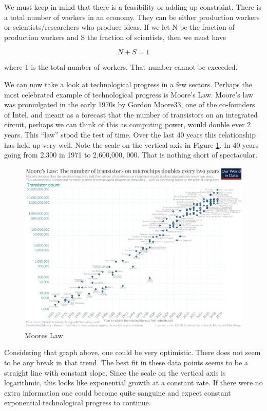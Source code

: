 \documentclass[
]{book}
\begin{document}
We must keep in mind that there is a feasibility or adding up constraint. There is a total number of workers in an economy. They can be either production workers or scientists/researchers who produce ideas. If we let N be the fraction of production workers and S the fraction of scientists, then we must have

\[ N + S = 1 \]

where 1 is the total number of workers. That number cannot be exceeded.

We can now take a look at technological progress in a few sectors. Perhaps the most celebrated example of technological progress is Moore's Law. Moore's law was promulgated in the early 1970s by Gordon Moore33, one of the co-founders of Intel, and meant as a forecast that the number of transistors on an integrated circuit, perhaps we can think of this as computing power, would double ever 2 years. This ``law'' stood the test of time. Over the last 40 years this relationship has held up very well. Note the scale on the vertical axis in Figure \ref{fig:growth15}. In 40 years going from 2,300 in 1971 to 2,600,000, 000. That is nothing short of spectacular.

\begin{figure}

{\centering \includegraphics[width=1\linewidth]{img/growth/moore15} 

}

\caption{Moores Law}\label{fig:growth15}
\end{figure}

Considering that graph above, one could be very optimistic. There does not seem to be any break in that trend. The best fit in these data points seems to be a straight line with constant slope. Since the scale on the vertical axis is logarithmic, this looks like exponential growth at a constant rate. If there were no extra information one could become quite sanguine and expect constant exponential technological progress to continue.
\end{document}
